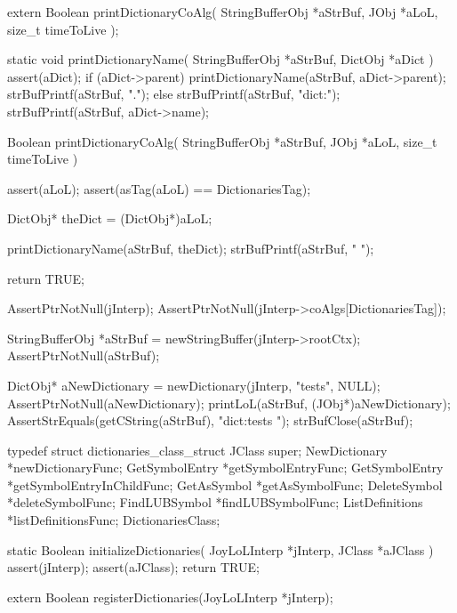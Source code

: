 
\startCHeader
extern Boolean printDictionaryCoAlg(
  StringBufferObj *aStrBuf,
  JObj            *aLoL,
  size_t           timeToLive
);
\stopCHeader
{}

\startCCode
static void printDictionaryName(
  StringBufferObj *aStrBuf,
  DictObj         *aDict
) {
  assert(aDict);
  if (aDict->parent) {
    printDictionaryName(aStrBuf, aDict->parent);
    strBufPrintf(aStrBuf, ".");
  } else {
    strBufPrintf(aStrBuf, "dict:");
  }
  strBufPrintf(aStrBuf, aDict->name);
}

Boolean printDictionaryCoAlg(
  StringBufferObj *aStrBuf,
  JObj            *aLoL,
  size_t           timeToLive
) {
  assert(aLoL);
  assert(asTag(aLoL) == DictionariesTag);
  
  DictObj* theDict = (DictObj*)aLoL;
  
  printDictionaryName(aStrBuf, theDict);
  strBufPrintf(aStrBuf, " ");
  
  return TRUE;
}
\stopCCode


\startCTest
  AssertPtrNotNull(jInterp);
  AssertPtrNotNull(jInterp->coAlgs[DictionariesTag]);

  StringBufferObj *aStrBuf = newStringBuffer(jInterp->rootCtx);
  AssertPtrNotNull(aStrBuf);
  
  DictObj* aNewDictionary = newDictionary(jInterp, "tests", NULL);
  AssertPtrNotNull(aNewDictionary);
  printLoL(aStrBuf, (JObj*)aNewDictionary);
  AssertStrEquals(getCString(aStrBuf), "dict:tests ");
  strBufClose(aStrBuf);
\stopCTest
\stopTestCase
\stopTestSuite

\startTestSuite[registerDictionaries]

\startCHeader
typedef struct dictionaries_class_struct {
  JClass           super;
  NewDictionary   *newDictionaryFunc;
  GetSymbolEntry  *getSymbolEntryFunc;
  GetSymbolEntry  *getSymbolEntryInChildFunc;
  GetAsSymbol     *getAsSymbolFunc;
  DeleteSymbol    *deleteSymbolFunc;
  FindLUBSymbol   *findLUBSymbolFunc;
  ListDefinitions *listDefinitionsFunc;  
} DictionariesClass;

\stopCHeader

\startCCode
static Boolean initializeDictionaries(
  JoyLoLInterp *jInterp,
  JClass       *aJClass
) {
  assert(jInterp);
  assert(aJClass);
  return TRUE;
}
\stopCCode

\startCHeader
extern Boolean registerDictionaries(JoyLoLInterp *jInterp);
\stopCHeader
{}

